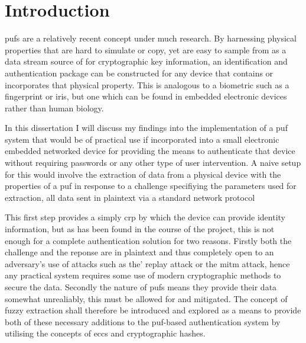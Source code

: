 
\chapter{Introduction} %

\label{ch:introduction} 


\Glspl{puf} are a relatively recent concept under much research.
By harnessing physical properties that are hard to simulate or copy, yet are
easy to sample from as a data stream source of for cryptographic key information,
an identification and authentication package can be constructed for any device
that contains or incorporates that physical property.
This is analogous to a biometric such as a fingerprint or iris, but one which
can be found in embedded electronic devices rather than human biology.

In this dissertation I will discuss my findings into the implementation of
a \gls{puf} system that would be of practical use if incorporated into a small
electronic embedded networked device for providing the means to authenticate that
device without requiring passwords or any other type of user intervention.
A naive setup for this would involve the extraction of data from a physical device
with the properties of a \gls{puf} in response to a challenge specifiying the
parameters used for extraction, all data sent in plaintext via a standard network protocol

This first step provides a simply \gls{crp} by which the device can provide
identity information, but as has been found in the course of the project,
this is not enough for a complete authentication solution for two reasons.
Firstly both the  challenge and the reponse are in plaintext and thus
completely open to an
adversary's use of attacks such as the' replay attack or the \gls{mitm} attack,
hence any practical system requires some use of modern cryptographic methods to
secure the data.
Secondly the nature of \glspl{puf} means they provide their
data somewhat unrealiably, this must be allowed for and mitigated.
The concept of fuzzy extraction shall therefore be introduced and explored as
a means to provide both of these necessary additions to the 
\gls{puf}-based authentication system by utilising the concepts of \glspl{ecc} and
cryptographic hashes.

